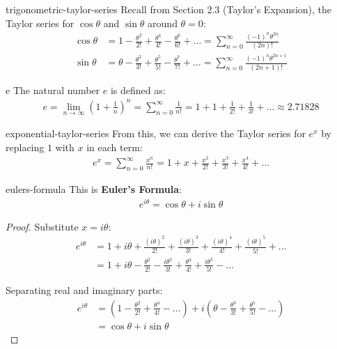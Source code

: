 \documentclass[12pt]{article}
\begin{document}
\begin{rem}{trigonometric-taylor-series}
Recall from Section 2.3 (Taylor's Expansion), the Taylor series for $\cos\theta$ and $\sin\theta$ around $\theta = 0$:
\begin{align}
\cos\theta &= 1 - \frac{\theta^2}{2!} + \frac{\theta^4}{4!} - \frac{\theta^6}{6!} + \ldots = \sum_{n=0}^{\infty} \frac{(-1)^n \theta^{2n}}{(2n)!} \\
\sin\theta &= \theta - \frac{\theta^3}{3!} + \frac{\theta^5}{5!} - \frac{\theta^7}{7!} + \ldots = \sum_{n=0}^{\infty} \frac{(-1)^n \theta^{2n+1}}{(2n+1)!}
\end{align}
\end{rem}

\begin{dfn}[Definition of $e$]{e}
The natural number $e$ is defined as:
\begin{align}
e = \lim_{n \to \infty} \left(1 + \frac{1}{n}\right)^n = \sum_{n=0}^{\infty} \frac{1}{n!} = 1 + 1 + \frac{1}{2!} + \frac{1}{3!} + \ldots \approx 2.71828
\end{align}
\end{dfn}

\begin{prop}{exponential-taylor-series}
From this, we can derive the Taylor series for $e^x$ by replacing $1$ with $x$ in each term:
\begin{align}
e^x = \sum_{n=0}^{\infty} \frac{x^n}{n!} = 1 + x + \frac{x^2}{2!} + \frac{x^3}{3!} + \frac{x^4}{4!} + \ldots
\end{align}
\end{prop}

\begin{thm}{eulers-formula}
This is \textbf{Euler's Formula}:
\begin{align}
e^{i\theta} = \cos\theta + i\sin\theta
\end{align}
\end{thm}

\begin{proof}
Substitute $x = i\theta$:
\begin{align}
e^{i\theta} &= 1 + i\theta + \frac{(i\theta)^2}{2!} + \frac{(i\theta)^3}{3!} + \frac{(i\theta)^4}{4!} + \frac{(i\theta)^5}{5!} + \ldots \nonumber \\
&= 1 + i\theta - \frac{\theta^2}{2!} - \frac{i\theta^3}{3!} + \frac{\theta^4}{4!} + \frac{i\theta^5}{5!} - \ldots
\end{align}

Separating real and imaginary parts:
\begin{align}
e^{i\theta} &= \left(1 - \frac{\theta^2}{2!} + \frac{\theta^4}{4!} - \ldots\right) + i\left(\theta - \frac{\theta^3}{3!} + \frac{\theta^5}{5!} - \ldots\right) \nonumber \\
&= \cos\theta + i\sin\theta
\end{align}
\end{proof}
\end{document}
